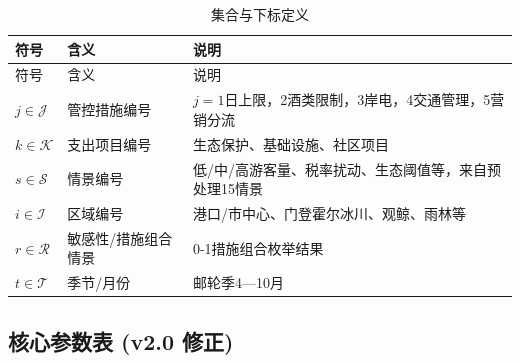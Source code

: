 \documentclass[UTF8,a4paper,12pt]{ctexart}
\begin{document}
\begin{longtable}{@{}p{2.2cm}p{4.0cm}p{8.5cm}@{}}
\caption{集合与下标定义}\\
\toprule
符号 & 含义 & 说明\\
\midrule
\endfirsthead
\toprule
符号 & 含义 & 说明\\
\midrule
\endhead
\(j\in\mathcal J\) & 管控措施编号 & \(j=1\)日上限，2酒类限制，3岸电，4交通管理，5营销分流\\
\(k\in\mathcal K\) & 支出项目编号 & 生态保护、基础设施、社区项目\\
\(s\in\mathcal S\) & 情景编号 & 低/中/高游客量、税率扰动、生态阈值等，来自预处理15情景\\
\(i\in\mathcal I\) & 区域编号 & 港口/市中心、门登霍尔冰川、观鲸、雨林等\\
\(r\in\mathcal R\) & 敏感性/措施组合情景 & 0-1措施组合枚举结果\\
\(t\in\mathcal T\) & 季节/月份 & 邮轮季4—10月\\
\bottomrule
\end{longtable}

\subsection{核心参数表 (v2.0 修正)}
\end{document}

